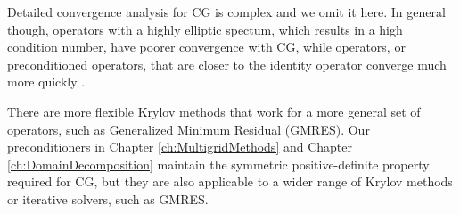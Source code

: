 Detailed convergence analysis for CG is complex and we omit it here.
In general though, operators with a highly elliptic spectum, which results in a high condition number, have poorer convergence with CG, while operators, or preconditioned operators, that are closer to the identity operator converge much more quickly \cite{golub1989matrix}.

There are more flexible Krylov methods that work for a more general set of operators, such as Generalized Minimum Residual (GMRES).
Our preconditioners in Chapter \ref{ch:MultigridMethods} and Chapter \ref{ch:DomainDecomposition} maintain the symmetric positive-definite property required for CG, but they are also applicable to a wider range of Krylov methods or iterative solvers, such as GMRES.